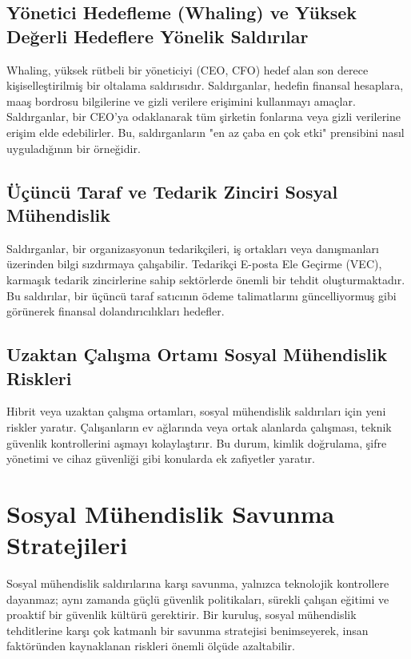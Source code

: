 \subsection{Yönetici Hedefleme (Whaling) ve Yüksek Değerli Hedeflere Yönelik Saldırılar}

Whaling, yüksek rütbeli bir yöneticiyi (CEO, CFO) hedef alan son derece kişiselleştirilmiş bir oltalama saldırısıdır. Saldırganlar, hedefin finansal hesaplara, maaş bordrosu bilgilerine ve gizli verilere erişimini kullanmayı amaçlar. Saldırganlar, bir CEO'ya odaklanarak tüm şirketin fonlarına veya gizli verilerine erişim elde edebilirler. Bu, saldırganların "en az çaba en çok etki" prensibini nasıl uyguladığının bir örneğidir.

\subsection{Üçüncü Taraf ve Tedarik Zinciri Sosyal Mühendislik}

Saldırganlar, bir organizasyonun tedarikçileri, iş ortakları veya danışmanları üzerinden bilgi sızdırmaya çalışabilir. Tedarikçi E-posta Ele Geçirme (VEC), karmaşık tedarik zincirlerine sahip sektörlerde önemli bir tehdit oluşturmaktadır. Bu saldırılar, bir üçüncü taraf satıcının ödeme talimatlarını güncelliyormuş gibi görünerek finansal dolandırıcılıkları hedefler.

\subsection{Uzaktan Çalışma Ortamı Sosyal Mühendislik Riskleri}

Hibrit veya uzaktan çalışma ortamları, sosyal mühendislik saldırıları için yeni riskler yaratır. Çalışanların ev ağlarında veya ortak alanlarda çalışması, teknik güvenlik kontrollerini aşmayı kolaylaştırır. Bu durum, kimlik doğrulama, şifre yönetimi ve cihaz güvenliği gibi konularda ek zafiyetler yaratır.

\section{Sosyal Mühendislik Savunma Stratejileri}

Sosyal mühendislik saldırılarına karşı savunma, yalnızca teknolojik kontrollere dayanmaz; aynı zamanda güçlü güvenlik politikaları, sürekli çalışan eğitimi ve proaktif bir güvenlik kültürü gerektirir. Bir kuruluş, sosyal mühendislik tehditlerine karşı çok katmanlı bir savunma stratejisi benimseyerek, insan faktöründen kaynaklanan riskleri önemli ölçüde azaltabilir.

